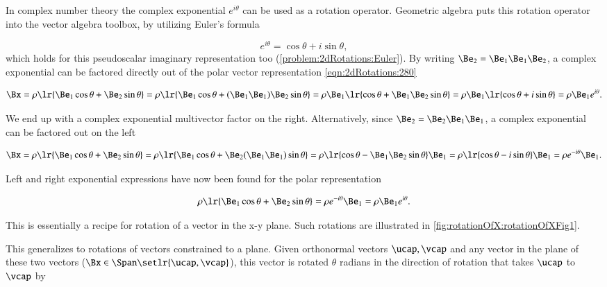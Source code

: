 In complex number theory the complex exponential \( e^{i\theta} \) can be used as a rotation operator.
Geometric algebra puts this rotation operator into the vector algebra toolbox, by utilizing
Euler's formula

\begin{dmath}\label{eqn:2dRotations:1140}
e^{i\theta} = \cos\theta + i \sin\theta,
\end{dmath}
which holds for this pseudoscalar imaginary representation too (\cref{problem:2dRotations:Euler}).
By writing \( \Be_2 = \Be_1 \Be_1 \Be_2 \),
a complex exponential can be factored directly out of the polar vector representation \cref{eqn:2dRotations:280}

\begin{dmath}\label{eqn:2dRotations:940}
\Bx
=
\rho \lr{ \Be_1 \cos\theta + \Be_2 \sin\theta }
=
\rho \lr{ \Be_1 \cos\theta + (\Be_1 \Be_1) \Be_2 \sin\theta }
=
\rho \Be_1 \lr{ \cos\theta + \Be_1 \Be_2 \sin\theta }
=
\rho \Be_1 \lr{ \cos\theta + i \sin\theta }
=
\rho \Be_1 e^{i\theta}.
\end{dmath}

We end up with a complex exponential multivector factor on the right.
Alternatively, since \( \Be_2 = \Be_2 \Be_1 \Be_1 \), a complex exponential can be factored out on the left

\begin{dmath}\label{eqn:2dRotations:960}
\Bx
=
\rho \lr{ \Be_1 \cos\theta + \Be_2 \sin\theta }
=
\rho \lr{ \Be_1 \cos\theta + \Be_2 (\Be_1 \Be_1) \sin\theta }
=
\rho \lr{ \cos\theta - \Be_1 \Be_2 \sin\theta } \Be_1
=
\rho \lr{ \cos\theta - i \sin\theta } \Be_1
=
\rho e^{-i\theta} \Be_1.
\end{dmath}

Left and right exponential expressions have now been found for the polar representation

\begin{equation}\label{eqn:2dRotations:1120}
\rho \lr{ \Be_1 \cos\theta + \Be_2 \sin\theta }
= \rho e^{-i\theta} \Be_1 = \rho \Be_1 e^{i\theta}.
\end{equation}

This is essentially a recipe for rotation of a vector in the x-y plane.
Such rotations are
illustrated in \cref{fig:rotationOfX:rotationOfXFig1}.

This generalizes to rotations of  vectors constrained to a plane.
Given orthonormal vectors \( \ucap, \vcap \) and any vector in the plane of these two vectors (\( \Bx \in \Span\setlr{\ucap,\vcap} \)), this vector is rotated \( \theta \) radians in the direction of rotation that takes \( \ucap \) to \( \vcap \) by

